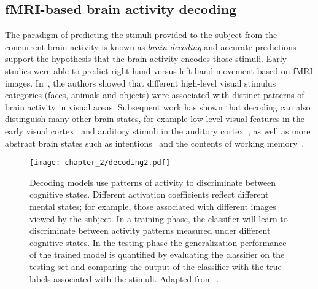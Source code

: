 




\subsection{fMRI-based brain activity decoding}\label{chap2_decoding}


The paradigm of predicting the stimuli provided to the subject from the concurrent brain activity is known as \emph{brain decoding} and accurate predictions support the hypothesis that the brain activity encodes those stimuli. Early studies \citep{dehaene1998inferring} were able to predict right hand versus left hand movement based on fMRI images. In~\citep{haxby2001distributed, cox2003}, the authors showed that different high-level visual stimulus categories (faces, animals and objects) were associated with distinct patterns of brain activity in visual areas. Subsequent work has shown that decoding can also distinguish many other brain states, for example low-level visual features in the early visual cortex~\citep{haynes2005predicting, kamitani2005decoding} and auditory stimuli in the auditory cortex~\citep{formisano2008saying, staeren2009sound}, as well as more abstract brain states such as intentions~\citep{haynes2007reading, soon2008unconscious} and the contents of working memory~\citep{harrison2009decoding}. 



\begin{figure}
\texttt{[image: chapter\_2/decoding2.pdf]}
\caption{Decoding models use patterns of activity to discriminate between cognitive states. Different \gls{activation coefficient}s reflect different mental states; for example, those associated with different images viewed by the subject. In a training phase, the classifier will learn to discriminate between activity patterns measured under different cognitive states. In the testing phase the generalization performance of the trained model is quantified by evaluating the classifier on the testing set and comparing the output of the classifier with the true labels associated with the stimuli. Adapted from~\citep{smith2013reading}.}\label{fig:c2_decoding}
\end{figure}


